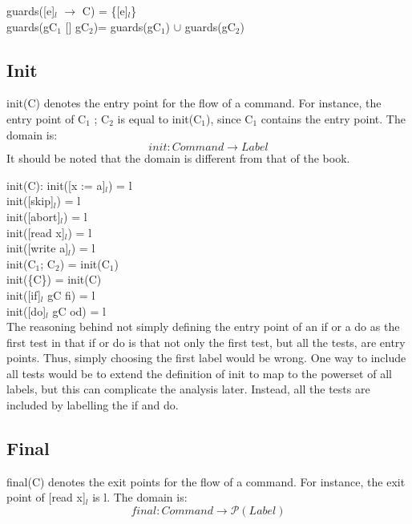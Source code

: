 \docpar
guards([e]$_l$ $\to$ C)      = \{[e]$_l$\}\\
guards(gC$_1$ [] gC$_2$)= guards(gC$_1$) $\cup$ guards(gC$_2$)\\

\subsection{Init}
init(C) denotes the entry point for the flow of a command.
For instance, the entry point of C$_1$ ; C$_2$ is equal to init(C$_1$),
since C$_1$ contains the entry point. The domain is:
\[init \colon Command \to Label\]
It should be noted that the domain is different from that of the book.

\docpar
init(C):\newline
init([x := a]$_l$)      = l\\
init([skip]$_l$)        = l\\
init([abort]$_l$)       = l\\
init([read x]$_l$)      = l\\
init([write a]$_l$)     = l\\
init(C$_1$; C$_2$)      = init(C$_1$)\\
init(\{C\})             = init(C)\\
init([if]$_l$ gC fi)        = l\\
init([do]$_l$ gC od)        = l\\

\docpar
The reasoning behind not simply defining the entry point of an if or a do as the first
test in that if or do is that not only the first test, but all the tests, are entry points.
Thus, simply choosing the first label would be wrong. One way to include all tests would
be to extend the definition of init to map to the powerset of all labels, but this
can complicate the analysis later. Instead, all the tests are included by labelling
the if and do.



\subsection{Final}
final(C) denotes the exit points for the flow of a command.
For instance, the exit point of [read x]$_l$ is l. The domain is:
\[final \colon Command \to \mathcal{P}(Label)\]

